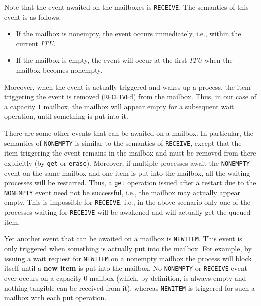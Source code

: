 Note that the event awaited on the mailboxes is {\tt RECEIVE}.
The semantics of this event is as follows:
\begin{itemize}
\item
If the mailbox is nonempty, the event occurs immediately, i.e., within the
current {\em ITU}.
\item
If the mailbox is empty, the event will occur at the first {\em ITU} when
the mailbox becomes nonempty.
\end{itemize}

Moreover, when the event is actually triggered and wakes up a process, the
item triggering the event is removed ({\tt RECEIVE}d) from the mailbox.
Thus, in our case of a capacity $1$ mailbox, the mailbox will appear empty
for a subsequent wait operation, until something is put into it.

There are some other events that can be awaited on a mailbox.
In particular, the semantics of {\tt NONEMPTY} is similar to the semantics
of {\tt RECEIVE}, except that the item triggering the event remains in
the mailbox and must be removed from there explicitly (by {\tt get} or
{\tt erase}).
Moreover, if multiple processes await the {\tt NONEMPTY} event on the same
mailbox and one item is put into the mailbox, all the waiting processes will
be restarted.
Thus, a {\tt get} operation issued after a restart due to the
{\tt NONEMPTY} event need not be successful, i.e., the mailbox may actually
appear empty.
This is impossible for {\tt RECEIVE}, i.e., in the above scenario only one
of the processes waiting for {\tt RECEIVE} will be awakened and will actually
get the queued item.

Yet another event that can be awaited on a mailbox is {\tt NEWITEM}.
This event is only triggered when something is actually
put into the mailbox.
For example, by issuing a wait request for {\tt NEWITEM} on a nonempty
mailbox the process will block itself until a {\bf new item} is put into
the mailbox.
No {\tt NONEMPTY} or {\tt RECEIVE}
event ever occurs on a capacity $0$ mailbox (which, by
definition, is always empty and nothing tangible
can be received from it), whereas
{\tt NEWITEM} is triggered for such a mailbox with each put operation.


